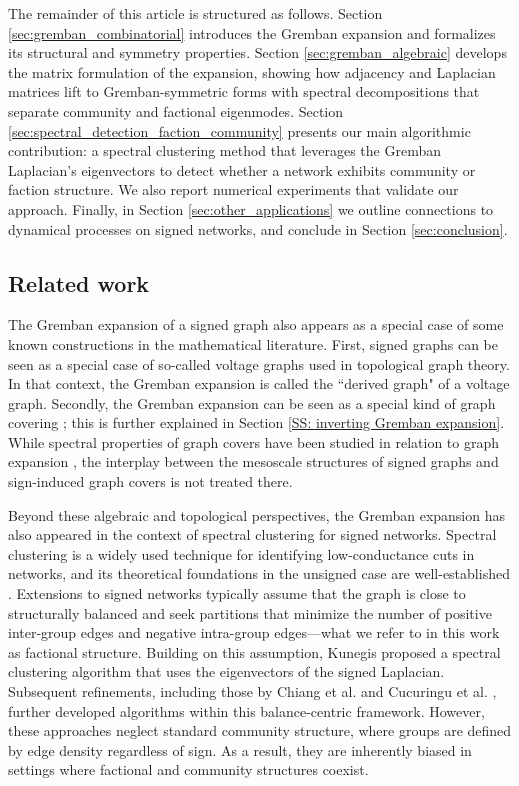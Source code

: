 \documentclass[reprint,onecolumn]{article}
\newcommand{\1}{\mathbb{1}}
\newcommand{\0}{\mathbf{0}}
\begin{document}
The remainder of this article is structured as follows. Section \ref{sec:gremban_combinatorial} introduces the Gremban expansion and formalizes its structural and symmetry properties. Section \ref{sec:gremban_algebraic} develops the matrix formulation of the expansion, showing how adjacency and Laplacian matrices lift to Gremban-symmetric forms with spectral decompositions that separate community and factional eigenmodes. Section \ref{sec:spectral_detection_faction_community} presents our main algorithmic contribution: a spectral clustering method that leverages the Gremban Laplacian's eigenvectors to detect whether a network exhibits community or faction structure. We also report numerical experiments that validate our approach. Finally, in Section \ref{sec:other_applications} we outline connections to dynamical processes on signed networks, and conclude in Section \ref{sec:conclusion}.
%
\subsection{Related work}

The Gremban expansion of a signed graph also appears as a special case of some known constructions in the mathematical literature. First, signed graphs can be seen as a special case of so-called voltage graphs \cite{gross1987topological} used in topological graph theory. In that context, the Gremban expansion is called the ``derived graph" of a voltage graph. Secondly, the Gremban expansion can be seen as a special kind of graph covering \cite[\S6.8]{godsil2001algebraic}; this is further explained in Section \ref{SS: inverting Gremban expansion}. While spectral properties of graph covers have been studied in relation to graph expansion \cite{bilu2006lifts}, the interplay between the mesoscale structures of signed graphs and sign-induced graph covers is not treated there.

Beyond these algebraic and topological perspectives, the Gremban expansion has also appeared in the context of spectral clustering for signed networks. Spectral clustering is a widely used technique for identifying low-conductance cuts in networks, and its theoretical foundations in the unsigned case are well-established \cite{ng2001spectral, vonLuxburg2007}. Extensions to signed networks typically assume that the graph is close to structurally balanced and seek partitions that minimize the number of positive inter-group edges and negative intra-group edges---what we refer to in this work as factional structure. Building on this assumption, Kunegis \cite{kunegis2010spectral} proposed a spectral clustering algorithm that uses the eigenvectors of the signed Laplacian. Subsequent refinements, including those by Chiang et al. \cite{chiang2012scalable} and Cucuringu et al. \cite{cucuringu2019sponge}, further developed algorithms within this balance-centric framework. However, these approaches neglect standard community structure, where groups are defined by edge density regardless of sign. As a result, they are inherently biased in settings where factional and community structures coexist. 
\end{document}
